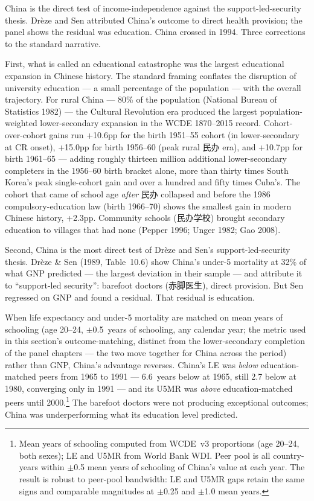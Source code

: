 \documentclass[12pt,letterpaper]{article}
\begin{document}
China is the direct test of income-independence against the
support-led-security thesis. Drèze and Sen attributed China's outcome
to direct health provision; the panel shows the residual was
education. China crossed in 1994. Three corrections to the standard
narrative.

First, what is called an educational catastrophe was
the largest educational expansion in Chinese history. The standard
framing conflates the disruption of university education --- a
small percentage of the population --- with the overall
trajectory. For rural China --- 80\% of the population
(National Bureau of Statistics 1982) --- the Cultural Revolution era
produced the largest population-weighted lower-secondary expansion in
the WCDE 1870--2015 record. Cohort-over-cohort gains run +10.6pp for
the birth 1951--55 cohort (in lower-secondary at CR onset), +15.0pp
for birth 1956--60 (peak rural 民办 era), and +10.7pp for birth
1961--65 --- adding roughly thirteen million additional lower-secondary
completers in the 1956--60 birth bracket alone, more than thirty times
South Korea's peak single-cohort gain and over a hundred and fifty
times Cuba's. The cohort that came of school age \emph{after} 民办
collapsed and before the 1986 compulsory-education law (birth
1966--70) shows the smallest gain in modern Chinese history, +2.3pp.
Community schools (民办学校) brought secondary education to
villages that had none (Pepper 1996; Unger 1982; Gao 2008).

Second, China is the most direct test of Drèze and Sen's
support-led-security thesis. Drèze \& Sen (1989, Table~10.6) show
China's under-5 mortality at 32\% of what GNP predicted --- the largest
deviation in their sample --- and attribute it to ``support-led
security'': barefoot doctors (赤脚医生), direct provision. But Sen
regressed on GNP and found a residual. That residual is education.

When life expectancy and under-5 mortality are matched on mean years of
schooling (age 20--24, $\pm$0.5~years of schooling, any calendar year;
the metric used in this section's outcome-matching, distinct from the
lower-secondary completion of the panel chapters --- the two move
together for China across the period) rather than GNP, China's
advantage reverses. China's LE was
\emph{below} education-matched peers from 1965 to 1991 --- 6.6~years
below at 1965, still 2.7 below at 1980, converging only in 1991 --- and
its U5MR was \emph{above} education-matched peers until 2000.\footnote{Mean years of schooling
computed from WCDE~v3 proportions (age 20--24, both sexes); LE and U5MR
from World Bank WDI. Peer pool is all country-years within $\pm$0.5
mean years of schooling of China's value at each year. The result is robust to peer-pool bandwidth: LE and U5MR gaps retain the same signs and comparable magnitudes at $\pm$0.25 and $\pm$1.0 mean years.} The barefoot
doctors were not producing exceptional outcomes; China was
underperforming what its education level predicted.
\end{document}
